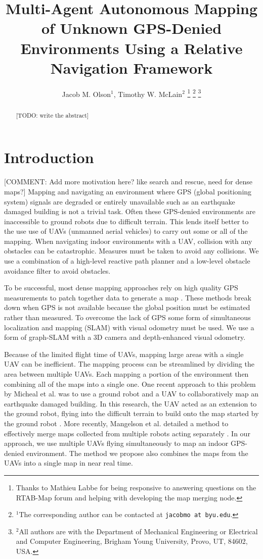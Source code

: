 \documentclass[letterpaper, 10 pt, conference]{ieeeconf}  %
\title{\LARGE \bf
Multi-Agent Autonomous Mapping of Unknown GPS-Denied Environments Using a Relative Navigation Framework}
\author{Jacob M. Olson$^{1}$, Timothy W. McLain$^{2}$%
\thanks{Thanks to Mathieu Labbe for being responsive to answering questions on the RTAB-Map forum and helping with developing the map merging node.}%
\thanks{$^{1}$The corresponding author can be contacted at
        {\tt\small jacobmo at byu.edu}.}%
\thanks{$^{2}$All authors are with the Department of Mechanical Engineering or Electrical and Computer Engineering,
        Brigham Young University, Provo, UT, 84602, USA.}%
}
\newcommand{\todo}[1]{{\color{blue}[TODO: #1]}}
\newcommand{\comment}[1]{{\color{red}[COMMENT: #1]}}
\begin{document}
\maketitle
\thispagestyle{empty}
\pagestyle{empty}


\begin{abstract}

\todo{write the abstract}

\end{abstract}


\section{Introduction}

\comment{Add more motivation here? like search and rescue, need for dense maps?}
Mapping and navigating an environment where GPS (global positioning system) signals are degraded or entirely unavailable such as an earthquake damaged building is not a trivial task. Often these GPS-denied environments are inaccessible to ground robots due to difficult terrain. This lends itself better to the use use of UAVs (unmanned aerial vehicles) to carry out some or all of the mapping. When navigating indoor environments with a UAV, collision with any obstacles can be catastrophic. Measures must be taken to avoid any collisions. We use a combination of a high-level reactive path planner and a low-level obstacle avoidance filter to avoid obstacles.

To be successful, most dense mapping approaches rely on high quality GPS measurements to patch together data to generate a map \cite{Siebert2014, Martin2015}. These methods break down when GPS is not available because the global position must be estimated rather than measured. To overcome the lack of GPS some form of simultaneous localization and mapping (SLAM) with visual odometry must be used. We use a form of graph-SLAM with a 3D camera and depth-enhanced visual odometry.

Because of the limited flight time of UAVs, mapping large areas with a single UAV can be inefficient. The mapping process can be streamlined by dividing the area between multiple UAVs. Each mapping a portion of the environment then combining all of the maps into a single one. One recent approach to this problem by Micheal et al. was to use a ground robot and a UAV to collaboratively map an earthquake damaged building. In this research, the UAV acted as an extension to the ground robot, flying into the difficult terrain to build onto the map started by the ground robot \cite{Michael2012}. More recently, Mangelson et al. detailed a method to effectively merge maps collected from multiple robots acting separately \cite{Mangelson2018}. In our approach, we use multiple UAVs flying simultaneously to map an indoor GPS-denied environment. The method we propose also combines the maps from the UAVs into a single map in near real time.
\end{document}
